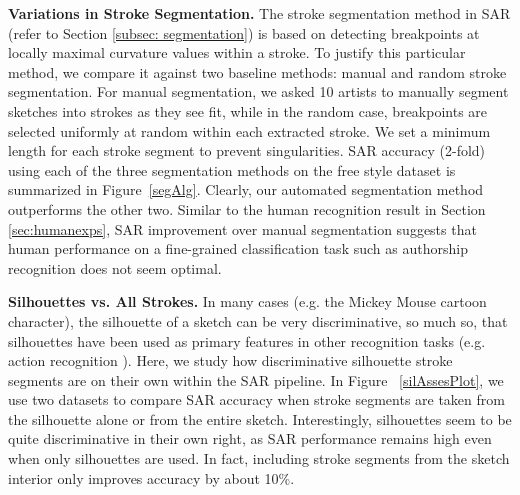 \noindent\textbf{Variations in Stroke Segmentation.} The stroke segmentation method in SAR (refer to Section \ref{subsec: segmentation}) is based on detecting breakpoints at locally maximal curvature values within a stroke. To justify this particular method, we compare it against two baseline methods: manual and random stroke segmentation.
For manual segmentation, we asked 10 artists to manually segment sketches into strokes as they see fit, while in the random case, breakpoints are selected uniformly at random within each extracted stroke. We set a minimum length for each stroke segment to prevent singularities. SAR accuracy (2-fold) using each of the three segmentation methods on the free style dataset is summarized in Figure~\ref{segAlg}. Clearly, our automated segmentation method outperforms the other two. Similar to the human recognition result in Section \ref{sec:humanexps}, SAR improvement over manual segmentation suggests that human performance on a fine-grained classification task such as authorship recognition does not seem optimal.



\noindent\textbf{Silhouettes vs. All Strokes.} In many cases (e.g. the Mickey Mouse cartoon character), the silhouette of a sketch can be very discriminative, so much so, that silhouettes have been used as primary features in other recognition tasks (e.g. action recognition \cite{li2008expandable}). Here, we study how discriminative silhouette stroke segments are on their own within the SAR pipeline. In Figure ~\ref{silAssesPlot}, we use two datasets to compare SAR accuracy when stroke segments are taken from the silhouette alone or from the entire sketch. Interestingly, silhouettes seem to be quite discriminative in their own right, as SAR performance remains high even when only silhouettes are used. In fact, including stroke segments from the sketch interior only improves accuracy by about 10\%.

